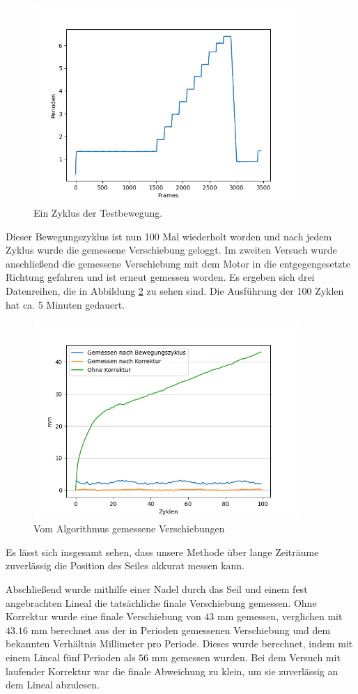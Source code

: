 \documentclass[10pt,a4paper]{scrarticle}
\begin{document}
\begin{figure}
\includegraphics[width=10cm]{Abbildungen/Bewegungszyklus.png}
  \centering
  \caption{Ein Zyklus der Testbewegung.}
  \label{fig:zyklus}
\end{figure}
Dieser Bewegungszyklus ist nun 100 Mal wiederholt worden und nach jedem Zyklus wurde die gemessene Verschiebung geloggt. Im zweiten Versuch wurde anschließend die gemessene Verschiebung mit dem Motor in die entgegengesetzte Richtung gefahren und ist erneut gemessen worden. Es ergeben sich drei Datenreihen, die in Abbildung \ref{fig:measured} zu sehen sind.  Die Ausführung der 100 Zyklen hat ca. 5 Minuten gedauert.
\begin{figure}
\includegraphics[width=10cm]{Abbildungen/Testergebnisse_durchrutschen.png}
  \centering
  \caption{Vom Algorithmus gemessene Verschiebungen}
  \label{fig:measured}
\end{figure}
Es lässt sich insgesamt sehen, dass unsere Methode über lange Zeiträume zuverlässig  die Position des Seiles akkurat messen kann.

Abschließend wurde mithilfe einer Nadel durch das Seil und einem fest angebrachten Lineal die tatsächliche finale Verschiebung gemessen. Ohne Korrektur wurde eine finale Verschiebung von $43$ mm gemessen, verglichen mit $43.16$ mm berechnet aus der in Perioden gemessenen Verschiebung und dem bekannten Verhältnis Millimeter pro Periode. Dieses wurde berechnet, indem mit einem Lineal fünf Perioden als $56$ mm gemessen wurden. 
Bei dem Versuch mit laufender Korrektur war die finale Abweichung zu klein, um sie zuverlässig an dem Lineal abzulesen.
\end{document}
